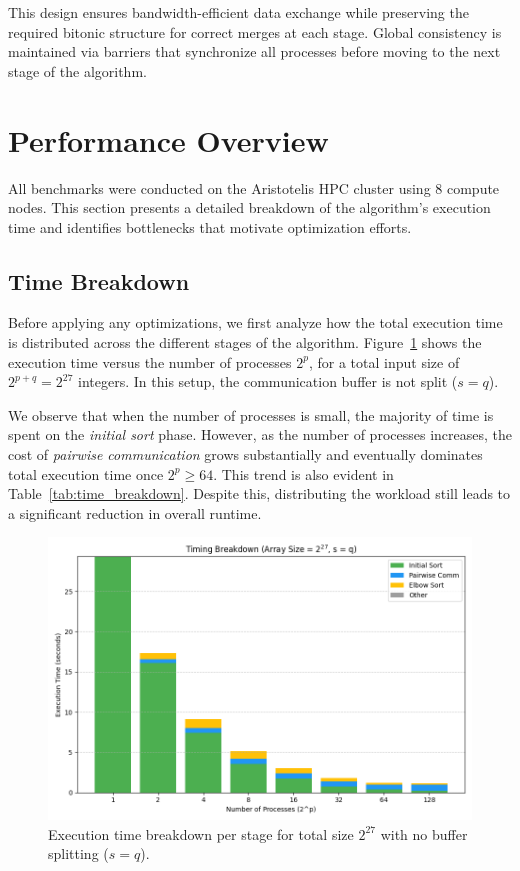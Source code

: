 \documentclass{article}
\begin{document}
This design ensures bandwidth-efficient data exchange while preserving the required bitonic structure for 
correct merges at each stage. Global consistency is maintained via barriers that synchronize all processes 
before moving to the next stage of the algorithm.

\section{Performance Overview}

All benchmarks were conducted on the Aristotelis HPC cluster using 8 compute nodes. This section presents a 
detailed breakdown of the algorithm's execution time and identifies bottlenecks that motivate optimization 
efforts.

\subsection{Time Breakdown}

Before applying any optimizations, we first analyze how the total execution time is distributed across the 
different stages of the algorithm. Figure~\ref{fig:stacked_timing} shows the execution time versus the number of 
processes $2^p$, for a total input size of $2^{p+q} = 2^{27}$ integers. In this setup, the communication buffer 
is not split ($s = q$).

We observe that when the number of processes is small, the majority of time is spent on the \textit{initial sort}
phase. However, as the number of processes increases, the cost of \textit{pairwise communication} grows 
substantially and eventually dominates total execution time once $2^p \geq 64$. This trend is also evident in 
Table~\ref{tab:time_breakdown}. Despite this, distributing the workload still leads to a significant reduction in 
overall runtime.

\begin{figure}
    \centering
    \includegraphics[width=1\linewidth]{figures/stacked_timing.png}
    \caption{Execution time breakdown per stage for total size $2^{27}$ with no buffer splitting ($s = q$).}
    \label{fig:stacked_timing}
\end{figure}
\end{document}
